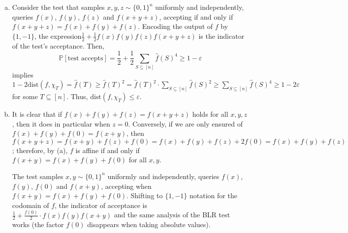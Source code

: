 \documentclass[12pt]{article}
\newcommand{\eps}{\varepsilon}
\newcommand{\bitset}{\{0,1\}}
\newcommand{\fbitset}{\{1,-1\}}
\renewcommand{\P}{\mathbb P}
\newcommand{\eqn}[1]{\begin{equation*}#1\end{equation*}}
\newcommand{\sumS}{\sum_{S \subseteq [n]}}
\begin{document}
\begin{enumerate}[(a)]
    \item Consider the test that samples $x, y, z \sim \bitset^n$ uniformly and independently, queries $f(x)$, $f(y)$, $f(z)$ and $f(x + y + z)$, accepting if and only if $f(x+y+z) = f(x) + f(y) + f(z)$. Encoding the output of $f$ by $\fbitset$, the expression$\frac1{2} + \frac1{2} f(x) f(y) f(z) f(x+y+z)$ is the indicator of the test's acceptance. Then,
    \eqn{\P[\text{test accepts}] = \frac1{2} + \frac1{2} \sumS \hat{f}(S)^4 \geq 1 - \eps}
    implies $1 - 2\text{dist}(f, \chi_T) = \hat{f}(T) \geq \hat{f}(T)^2  = \hat{f}(T)^2 \cdot \sumS \hat{f}(S)^2 \geq \sumS \hat{f}(S)^4 \geq 1 - 2\eps$ for some $T \subseteq [n]$. Thus, $\text{dist}(f, \chi_T) \leq \eps$.
    
    \item It is clear that if $f(x) + f(y) + f(z) = f(x + y + z)$ holds for all $x,y,z$, then it does in particular when $z = 0$. Conversely, if we are only ensured of $f(x) + f(y) + f(0) = f(x + y)$, then $f(x + y + z) = f(x + y) + f(z) + f(0) = f(x) + f(y) + f(z) + 2f(0) = f(x) + f(y) + f(z)$; therefore, by (a), $f$ is affine if and only if $f(x+y) = f(x) + f(y) + f(0)$ for all $x,y$.
    
    The test samples $x,y \sim \bitset^n$ uniformly and independently, queries $f(x)$, $f(y)$, $f(0)$ and $f(x+y)$, accepting when $f(x+y) = f(x) + f(y) + f(0)$. Shifting to $\fbitset$ notation for the codomain of $f$, the indicator of acceptance is $\frac1{2} + \frac{f(0)}{2} \cdot f(x) f(y) f(x+y)$ and the same analysis of the BLR test works (the factor $f(0)$ disappears when taking absolute values).
\end{enumerate}
\end{document}
